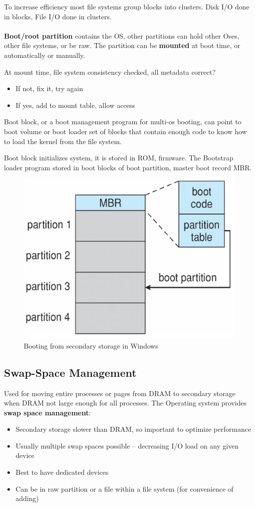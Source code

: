 To increase efficiency most file systems group blocks into clusters. Disk I/O done in blocks, File I/O done in clusters.


\paragraph{}

\textbf{Boot/root partition} contains the OS, other partitions can hold other Oses, other file systems, or be raw. The partition can be \textbf{mounted} at boot time, or automatically or manually.

At mount time, file system consistency checked, all metadata correct? 

\begin{itemize}
    \item[] If not, fix it, try again
    \item[] If yes, add to mount table, allow access
\end{itemize}

Boot block, or a boot management program for multi-os booting, can point to boot volume or boot loader set of blocks that
contain enough code to know how to load the kernel from the file system.

Boot block initializes system, it is stored in ROM, firmware. The Bootstrap loader program
stored in boot blocks of boot partition, master boot record MBR.

\begin{figure}[h!]
    \centering
    \includegraphics[width=0.37\linewidth]{img/fhmgmfgzh.png}
    \caption{Booting from secondary
storage in Windows}
\end{figure}

\subsection{Swap-Space Management}
Used for moving entire processes or pages from DRAM to secondary
storage when DRAM not large enough for all processes. The Operating system provides \textbf{swap space management}:

\begin{itemize}
    \item Secondary storage slower than DRAM, so important to optimize performance
    \item Usually multiple swap spaces possible – decreasing I/O load on any given device
    \item Best to have dedicated devices
    \item Can be in raw partition or a file within a file system (for convenience of adding)
\end{itemize}


